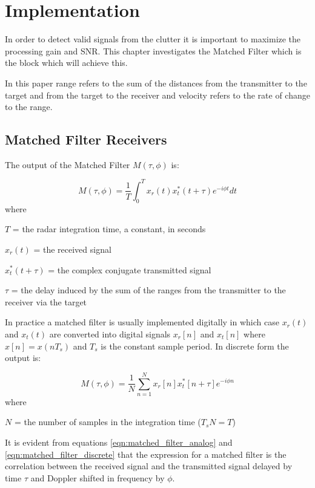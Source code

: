 \documentclass[a4paper]{report}
\numberwithin{equation}{chapter}
\begin{document}
\clearpage\setcounter{page}{1}
\chapter[Implementation]{Implementation}
In order to detect valid signals from the clutter it is important to maximize the processing gain and SNR. This chapter investigates the Matched Filter which is the block which will achieve this.

\bigskip

In this paper range refers to the sum of the distances from the transmitter to the target and from the target to the receiver and velocity refers to the rate of change to the range.

\section[Matched Filter Receivers]{Matched Filter Receivers}

The output of the Matched Filter $M(\tau, \phi)$ is:

\begin{equation}
M(\tau, \phi) = \frac{1}{T} \int_0^T x_r(t)x_t^*(t + \tau)e^{-i\phi t}dt
\label{eqn:matched_filter_analog}
\end{equation}
where

$T$ = the radar integration time, a constant, in seconds

$x_r(t)$ = the received signal

$x_t^*(t + \tau)$ = the complex conjugate transmitted signal

$\tau$ = the delay induced by the sum of the ranges from the transmitter to the receiver via the target

\bigskip

In practice a matched filter is usually implemented digitally in which case $x_r(t)$ and $x_t(t)$ are converted into digital signals $x_r[n]$ and $x_t[n]$ where $x[n] = x(nT_s)$ and $T_s$ is the constant sample period. In discrete form the output is:

\begin{equation}
M(\tau, \phi) = \frac{1}{N} \sum_{n=1}^{N} x_r[n] x_t^*[n + \tau]e^{-i\phi n}
\label{eqn:matched_filter_discrete}
\end{equation}
where

$N$ = the number of samples in the integration time ($T_sN = T$)

\bigskip

It is evident from equations \ref{eqn:matched_filter_analog} and \ref{eqn:matched_filter_discrete} that the expression for a matched filter is the correlation between the received signal and the transmitted signal delayed by time $\tau$ and Doppler shifted in frequency by $\phi$.
\end{document}
